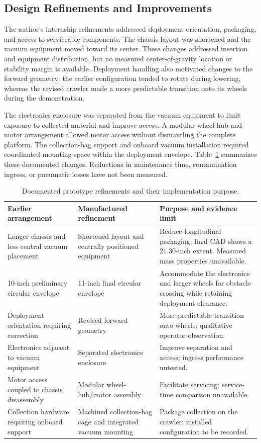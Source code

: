\subsection{Design Refinements and Improvements}
\label{sec:prototype-refinements}
The author's internship refinements addressed deployment orientation, packaging, and access to serviceable components. The chassis layout was shortened and the vacuum equipment moved toward its center. These changes addressed insertion and equipment distribution, but no measured center-of-gravity location or stability margin is available. Deployment handling also motivated changes to the forward geometry: the earlier configuration tended to rotate during lowering, whereas the revised crawler made a more predictable transition onto its wheels during the demonstration.

The electronics enclosure was separated from the vacuum equipment to limit exposure to collected material and improve access. A modular wheel-hub and motor arrangement allowed motor access without dismantling the complete platform. The collection-bag support and onboard vacuum installation required coordinated mounting space within the deployment envelope. Table~\ref{tab:prototype-refinements} summarizes these documented changes. Reductions in maintenance time, contamination ingress, or pneumatic losses have not been measured.

\begin{table}[H]\centering
\caption{Documented prototype refinements and their implementation purpose.}
\label{tab:prototype-refinements}
\begingroup\small\singlespacing\renewcommand{\arraystretch}{1.2}
\begin{tabularx}{\textwidth}{@{}XXX@{}}\toprule
Earlier arrangement & Manufactured refinement & Purpose and evidence limit \\\midrule
Longer chassis and less central vacuum placement & Shortened layout and centrally positioned equipment & Reduce longitudinal packaging; final CAD shows a 21.30-inch extent. Measured mass properties unavailable. \\
10-inch preliminary circular envelope & 11-inch final circular envelope & Accommodate the electronics and larger wheels for obstacle crossing while retaining deployment clearance. \\
Deployment orientation requiring correction & Revised forward geometry & More predictable transition onto wheels; qualitative operator observation. \\
Electronics adjacent to vacuum equipment & Separated electronics enclosure & Improve separation and access; ingress performance untested. \\
Motor access coupled to chassis disassembly & Modular wheel-hub/motor assembly & Facilitate servicing; service-time comparison unavailable. \\
Collection hardware requiring onboard support & Machined collection-bag cage and integrated vacuum mounting & Package collection on the crawler; installed configuration to be recorded. \\
\bottomrule\end{tabularx}\endgroup
\end{table}

